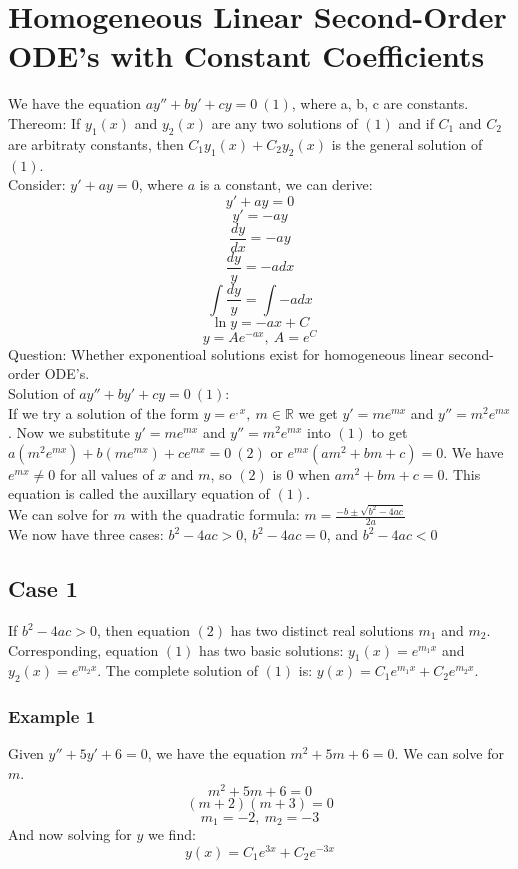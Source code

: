 \documentclass{article}
\begin{document}
\section{Homogeneous Linear Second-Order ODE's with Constant Coefficients}

We have the equation $ay'' + by' + cy = 0~(1)$, where a, b, c are constants.
\\
Thereom: If $y_1(x)$ and $y_2(x)$ are any two solutions of 
$(1)$ and if $C_1$ and $C_2$ are arbitraty constants, then
$C_1y_1(x) + C_2y_2(x)$ is the general solution of $(1)$.
\\
Consider: $y' + ay = 0$, where $a$ is a constant, we can derive:
$$y'+ ay = 0$$
$$y' = -ay$$
$$\frac{dy}{dx} = -ay$$
$$\frac{dy}{y} = -adx$$
$$\int{\frac{dy}{y}} = \int{-adx}$$
$$\ln{y} = -ax + C$$
$$y = Ae^{-ax},~A = e^C$$
Question: Whether exponentioal solutions exist for homogeneous linear
second-order ODE's.
\\
Solution of $ay'' + by' + cy = 0~(1)$:
\\
If we try a solution of the form $y=e^{,x},~m\in\mathbb{R}$ we get
$y' = me^{mx}$ and $y'' = m^2e^{mx}$.  Now we substitute $y' = me^{mx}$
and $y'' = m^2e^{mx}$ into $(1)$ to get
$a(m^2e^{mx}) + b(me^{mx}) + ce^{mx} = 0~(2)$ or
$e^{mx}(am^2 + bm + c) = 0$.  We have $e^{mx} \neq 0$ for all values of
$x$ and $m$, so $(2)$ is $0$ when $am^2 + bm + c = 0$.  This equation is
called the auxillary equation of $(1)$.
\\
We can solve for $m$ with the quadratic formula: 
$m = \frac{-b \pm \sqrt{b^2 - 4ac}}{2a}$
\\
We now have three cases: $b^2 - 4ac > 0$, $b^2 - 4ac = 0$, and 
$b^2 - 4ac < 0$
\\
\subsection{Case 1}
If $b^2 - 4ac > 0$, then equation $(2)$ has two distinct real solutions $m_1$
and $m_2$.  Corresponding, equation $(1)$ has two basic solutions:
$y_1(x) = e^{m_1x}$ and $y_2(x) = e^{m_2x}$.  The complete solution of $(1)$
is: $y(x) = C_1e^{m_1x} + C_2e^{m_2x}$.

\subsubsection{Example 1}
Given $y'' + 5y' + 6 = 0$, we have the equation $m^2 + 5m + 6 = 0$.  We can
solve for $m$.
$$m^2 + 5m + 6 = 0$$
$$(m + 2)(m + 3) = 0$$
$$m_1 = -2,~m_2 = -3$$
And now solving for $y$ we find:
$$y(x) = C_1e^{3x} + C_2e^{-3x}$$
\end{document}
